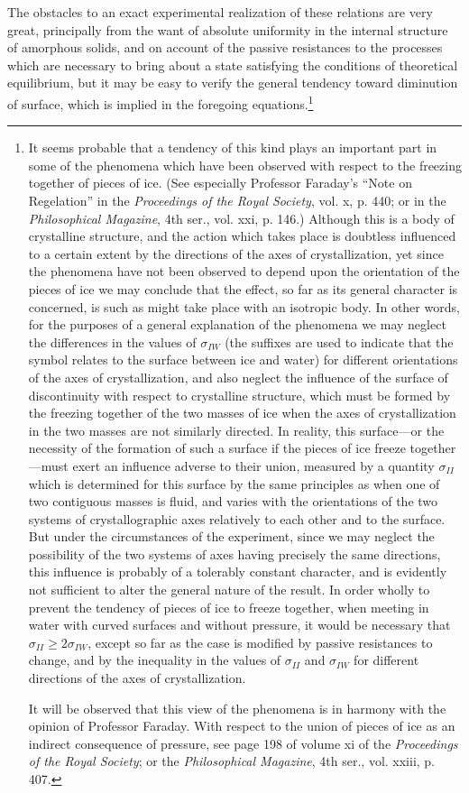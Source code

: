 \documentclass[12pt]{memoir}
\begin{document}
The obstacles to an exact experimental realization of these relations are very great, principally from the want of absolute uniformity in the internal structure of amorphous solids, and on account of the passive resistances to the processes which are necessary to bring about a state satisfying the conditions of theoretical equilibrium, but it may be easy to verify the general tendency toward diminution of surface, which is implied in the foregoing equations.\footnote{It seems probable that a tendency of this kind plays an important part in some of the phenomena which have been observed with respect to the freezing together of pieces of ice. (See especially Professor Faraday's ``Note on Regelation'' in the \textit{Proceedings of the Royal Society}, vol. x, p. 440; or in the \textit{Philosophical Magazine}, 4th ser., vol. xxi, p. 146.) Although this is a body of crystalline structure, and the action which takes place is doubtless influenced to a certain extent by the directions of the axes of crystallization, yet since the phenomena have not been observed to depend upon the orientation of the pieces of ice we may conclude that the effect, so far as its general character is concerned, is such as might take place with an isotropic body. In other words, for the purposes of a general explanation of the phenomena we may neglect the differences in the values of $\sigma_{IW}$ (the suffixes are used to indicate that the symbol relates to the surface between ice and water) for different orientations of the axes of crystallization, and also neglect the influence of the surface of discontinuity with respect to crystalline structure, which must be formed by the freezing together of the two masses of ice when the axes of crystallization in the two masses are not similarly directed. In reality, this surface---or the necessity of the formation of such a surface if the pieces of ice freeze together---must exert an influence adverse to their union, measured by a quantity $\sigma_{II}$ which is determined for this surface by the same principles as when one of two contiguous masses is fluid, and varies with the orientations of the two systems of crystallographic axes relatively to each other and to the surface. But under the circumstances of the experiment, since we may neglect the possibility of the two systems of axes having precisely the same directions, this influence is probably of a tolerably constant character, and is evidently not sufficient to alter the general nature of the result. In order wholly to prevent the tendency of pieces of ice to freeze together, when meeting in water with curved surfaces and without pressure, it would be necessary that $\sigma_{II}\geq 2 \sigma_{IW}$, except so far as the case is modified by passive resistances to change, and by the inequality in the values of $\sigma_{II}$ and $\sigma_{IW}$ for different directions of the axes of crystallization. \par
It will be observed that this view of the phenomena is in harmony with the opinion of Professor Faraday. With respect to the union of pieces of ice as an indirect consequence of pressure, see page 198 of volume xi of the \textit{Proceedings of the Royal Society}; or the \textit{Philosophical Magazine}, 4th ser., vol. xxiii, p. 407.}
\end{document}
